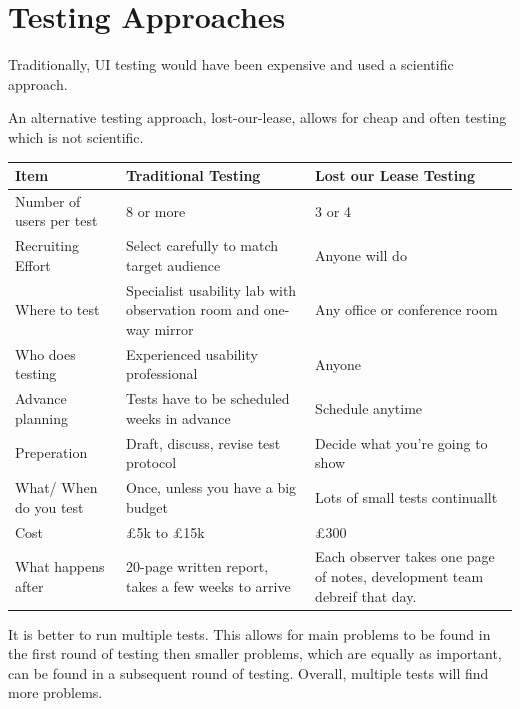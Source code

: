 \section*{Testing Approaches}
Traditionally, UI testing would have been expensive and used a scientific approach. 

An alternative testing approach, lost-our-lease, allows for cheap and often testing which is not scientific.

\begin{table}[H]
    \centering
    \begin{tabular}{p{} p{} p{}}
        \textbf{Item} & \textbf{Traditional Testing} & \textbf{Lost our Lease Testing}\\
        \hline
        \hline
        Number of users per test & 8 or more & 3 or 4\\
        \hline
        Recruiting Effort & Select carefully to match target audience & Anyone will do\\
        \hline
        Where to test & Specialist usability lab with observation room and one-way mirror & Any office or conference room\\
        \hline
        Who does testing & Experienced usability professional & Anyone\\
        \hline
        Advance planning & Tests have to be scheduled weeks in advance & Schedule anytime\\
        \hline
        Preperation & Draft, discuss, revise test protocol & Decide what you're going to show \\
        \hline
        What/ When do you test & Once, unless you have a big budget & Lots of small tests continuallt\\
        \hline
        Cost & £5k to £15k & £300\\
        \hline
        What happens after  & 20-page written report, takes a few weeks to arrive & Each observer takes one page of notes, development team debreif that day.\\
        \hline
        
    \end{tabular}
\end{table}

It is better to run multiple tests. This allows for main problems to be found in the first round of testing then smaller problems, which are equally as important, can be found in a subsequent round of testing. Overall, multiple tests will find more problems. 

